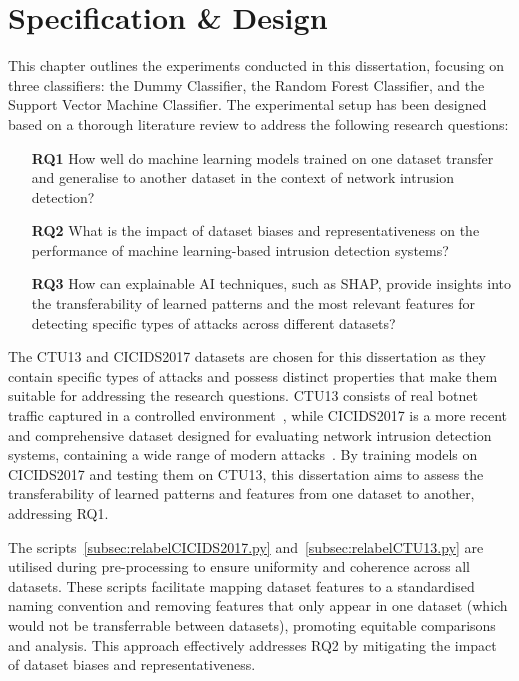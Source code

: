 \chapter{Specification \& Design}

This chapter outlines the experiments conducted in this dissertation, focusing on three classifiers: the Dummy Classifier, the Random Forest Classifier, and the Support Vector Machine Classifier. The experimental setup has been designed based on a thorough literature review to address the following research questions:

\begin{enumerate}
\item[\textbf{RQ1}] How well do machine learning models trained on one dataset transfer and generalise to another dataset in the context of network intrusion detection?
\item[\textbf{RQ2}] What is the impact of dataset biases and representativeness on the performance of machine learning-based intrusion detection systems?
\item[\textbf{RQ3}] How can explainable AI techniques, such as SHAP, provide insights into the transferability of learned patterns and the most relevant features for detecting specific types of attacks across different datasets?
\end{enumerate}

The CTU13 and CICIDS2017 datasets are chosen for this dissertation as they contain specific types of attacks and possess distinct properties that make them suitable for addressing the research questions. CTU13 consists of real botnet traffic captured in a controlled environment~\cite{garcia2014empirical}, while CICIDS2017 is a more recent and comprehensive dataset designed for evaluating network intrusion detection systems, containing a wide range of modern attacks~\cite{sharafaldin2018toward}. By training models on CICIDS2017 and testing them on CTU13, this dissertation aims to assess the transferability of learned patterns and features from one dataset to another, addressing RQ1.

The scripts~\ref{subsec:relabelCICIDS2017.py} and~\ref{subsec:relabelCTU13.py} are utilised during pre-processing to ensure uniformity and coherence across all datasets. These scripts facilitate mapping dataset features to a standardised naming convention and removing features that only appear in one dataset (which would not be transferrable between datasets), promoting equitable comparisons and analysis. This approach effectively addresses RQ2 by mitigating the impact of dataset biases and representativeness.

